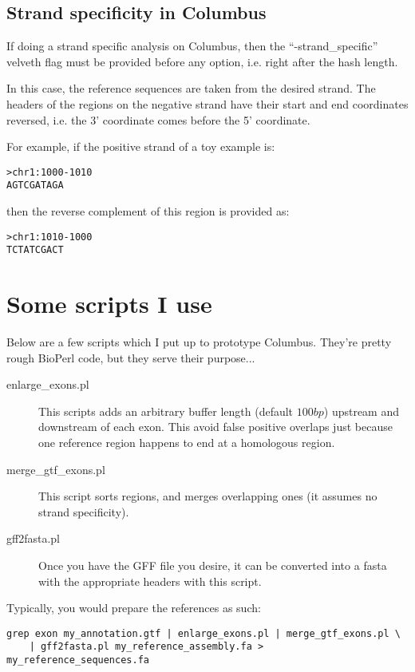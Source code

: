 \documentclass[12pt]{article}
\begin{document}
\subsection{Strand specificity in Columbus}

If doing a strand specific analysis on Columbus, then the ``-strand\_specific'' velveth flag must be provided before any option, i.e. right after the
hash length. 

In this case, the reference sequences are taken from the desired strand. The headers of the regions on the negative strand have their
start and end coordinates reversed, i.e. the 3' coordinate comes before the 5' coordinate. 

For example, if the positive strand of a toy example is:
\begin{verbatim}
>chr1:1000-1010
AGTCGATAGA
\end{verbatim}

then the reverse complement of this region is provided as:
\begin{verbatim}
>chr1:1010-1000
TCTATCGACT
\end{verbatim}

\section{Some scripts I use}

Below are a few scripts which I put up to prototype Columbus. They're pretty rough BioPerl code, but they serve their purpose...

\begin{description}

\item[enlarge\_exons.pl] This scripts adds an arbitrary buffer length (default $100 bp$) upstream and downstream of each exon. This avoid false positive
overlaps just because one reference region happens to end at a homologous region.

\item[merge\_gtf\_exons.pl] This script sorts regions, and merges overlapping ones (it assumes no strand specificity).

\item[gff2fasta.pl] Once you have the GFF file you desire, it can be converted into a fasta with the appropriate headers with this script. 

\end{description}

Typically, you would prepare the references as such:
\begin{verbatim}
grep exon my_annotation.gtf | enlarge_exons.pl | merge_gtf_exons.pl \
	| gff2fasta.pl my_reference_assembly.fa > my_reference_sequences.fa
\end{verbatim}
\end{document}
